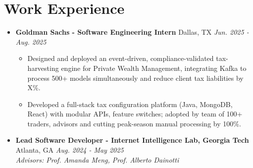 \documentclass[A4,10pt]{article}
\begin{document}
\section{\textcolor{NavyBlue}{Work Experience}}
  \begin{itemize}[leftmargin=0in, label={}]
     \item \textbf{\fontsize{11}{12}\selectfont 
     Goldman Sachs - Software Engineering Intern} \hfill  Dallas, TX \textbar \textit{Jun. 2025 - Aug. 2025} \\
    \vspace{-1mm}
    \begin{itemize}[leftmargin=0.25in, label=$\bullet$]  %
            \item{Designed and deployed an event-driven, compliance-validated tax-harvesting engine for Private Wealth Management, integrating Kafka to process 500+ models simultaneously and reduce client tax liabilities by X\%.}
            \item{Developed a full-stack tax configuration platform (Java, MongoDB, React) with modular APIs, feature switches; adopted by team of 100+ traders, advisors and cutting peak-season manual processing by 100\%.} 
    \end{itemize}

    \vspace{-2mm}

 \item \textbf{\fontsize{11}{12}\selectfont Lead Software Developer - Internet Intelligence Lab, Georgia Tech} \hfill Atlanta, GA \textbar \textit{Aug. 2024 - May 2025} \\
    \textit{Advisors: \textit{Prof. Amanda Meng, Prof. Alberto Dainotti}}
    \vspace{-2mm}
    \vspace{-2mm}



\end{itemize}
\end{document}
